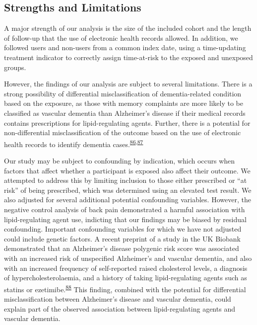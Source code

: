 \documentclass[a4paper, twoside]{templates/ociamthesis}
\begin{document}
\hypertarget{strengths-and-limitations}{%
\subsection{Strengths and Limitations}\label{strengths-and-limitations}}

A major strength of our analysis is the size of the included cohort and the length of follow-up that the use of electronic health records allowed. In addition, we followed users and non-users from a common index date, using a time-updating treatment indicator to correctly assign time-at-risk to the exposed and unexposed groups.

However, the findings of our analysis are subject to several limitations. There is a strong possibility of differential misclassification of dementia-related condition based on the exposure, as those with memory complaints are more likely to be classified as vascular dementia than Alzheimer's disease if their medical records contains prescriptions for lipid-regulating agents. Further, there is a potential for non-differential misclassification of the outcome based on the use of electronic health records to identify dementia cases.\textsuperscript{\protect\hyperlink{ref-wilkinson2018}{86},\protect\hyperlink{ref-mcguinness2019b}{87}}

Our study may be subject to confounding by indication, which occurs when factors that affect whether a participant is exposed also affect their outcome. We attempted to address this by limiting inclusion to those either prescribed or ``at risk'' of being prescribed, which was determined using an elevated test result. We also adjusted for several additional potential confounding variables. However, the negative control analysis of back pain demonstrated a harmful association with lipid-regulating agent use, indicting that our findings may be biased by residual confounding. Important confounding variables for which we have not adjusted could include genetic factors. A recent preprint of a study in the UK Biobank demonstrated that an Alzheimer's disease polygenic risk score was associated with an increased risk of unspecified Alzheimer's and vascular dementia, and also with an increased frequency of self-reported raised cholesterol levels, a diagnosis of hypercholesterolaemia, and a history of taking lipid-regulating agents such as statins or ezetimibe.\textsuperscript{\protect\hyperlink{ref-korologou-linden2020}{88}} This finding, combined with the potential for differential misclassification between Alzheimer's disease and vascular dementia, could explain part of the observed association between lipid-regulating agents and vascular dementia.
\end{document}

